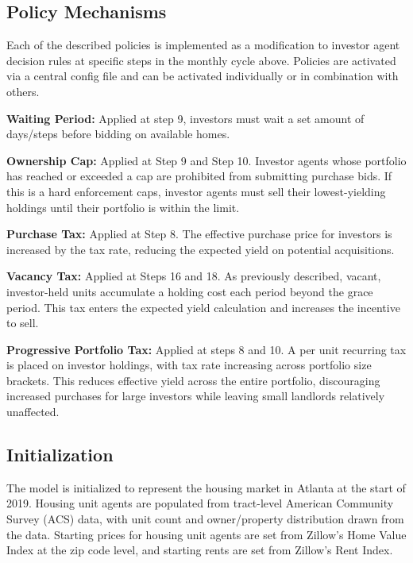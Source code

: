 \documentclass[twocolumn,showpacs,%
  nofootinbib,aps,superscriptaddress,%
  eqsecnum,prd,notitlepage,showkeys,10pt]{revtex4-1}
\begin{document}
\subsection{Policy Mechanisms}
Each of the described policies is implemented as a modification to investor agent decision rules at specific steps in the monthly cycle above. Policies are activated via a central config file and can be activated individually or in combination with others. 

\textbf{Waiting Period:} Applied at step 9, investors must wait a set amount of days/steps before bidding on available homes. 

\textbf{Ownership Cap:} Applied at Step 9 and Step 10. Investor agents whose portfolio has reached or exceeded a cap are prohibited from submitting purchase bids. If this is a hard enforcement caps, investor agents must sell their lowest-yielding holdings until their portfolio is within the limit. 

\textbf{Purchase Tax:} Applied at Step 8. The effective purchase price for investors is increased by the tax rate, reducing the expected yield on potential acquisitions. 

\textbf{Vacancy Tax:} Applied at Steps 16 and 18. As previously described, vacant, investor-held units accumulate a holding cost each period beyond the grace period. This tax enters the expected yield calculation and increases the incentive to sell.

\textbf{Progressive Portfolio Tax: } Applied at steps 8 and 10. A per unit recurring tax is placed on investor holdings, with tax rate increasing across portfolio size brackets. This reduces effective yield across the entire portfolio, discouraging increased purchases for large investors while leaving small landlords relatively unaffected.


\subsection{Initialization}

The model is initialized to represent the housing market in Atlanta at the start of 2019. Housing unit agents are populated from tract-level American Community Survey (ACS) data, with unit count and owner/property distribution drawn from the data. Starting prices for housing unit agents are set from Zillow's Home Value Index at the zip code level, and starting rents are set from Zillow's Rent Index. \newline
\end{document}
